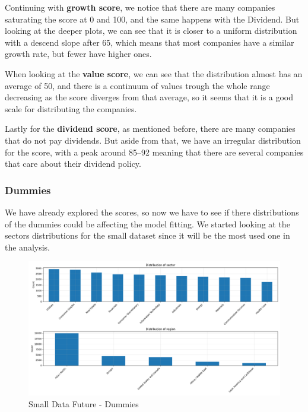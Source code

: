 \documentclass[11pt,english,a4paper,hidelinks]{book}
\begin{document}
\vspace{0.5cm}
\noindent Continuing with \textbf{growth score}, we notice that there are many companies saturating the score at 0 and 100, and the same happens with the Dividend. But looking at the deeper plots, we can see that it is closer to a uniform distribution with a descend slope after 65, which means that most companies have a similar growth rate, but fewer have higher ones.

\vspace{0.5cm}
\noindent When looking at the \textbf{value score}, we can see that the distribution almost has an average of 50, and there is a continuum of values trough the whole range decreasing as the score diverges from that average, so it seems that it is a good scale for distributing the companies.

\vspace{0.5cm}
\noindent Lastly for the \textbf{dividend score}, as mentioned before, there are many companies that do not pay dividends. But aside from that, we have an irregular distribution for the score, with a peak around 85--92 meaning that there are several companies that care about their dividend policy.

\subsubsection{Dummies}

We have already explored the scores, so now we have to see if there distributions of the dummies could be affecting the model fitting. We started looking at the sectors distributions for the small dataset since it will be the most used one in the analysis.

\begin{figure}[H]
    \centering
    \includegraphics[width=1\linewidth]{images/code/descriptive analysis/distributions/Small Data future - Dummies.png}
    \caption{Small Data Future - Dummies}
    \label{fig:small_future_dummies}
\end{figure}
\end{document}
